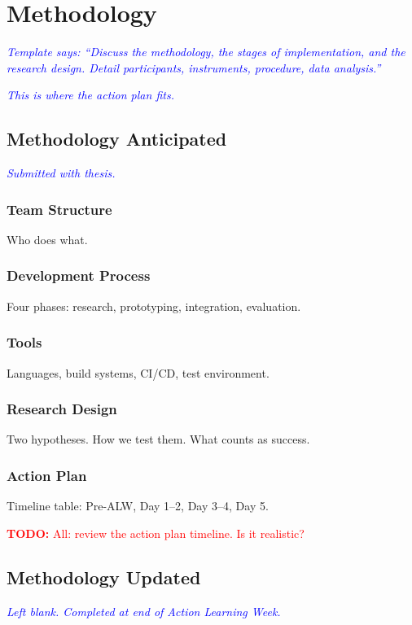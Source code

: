 \documentclass[12pt,oneside]{report}
\newcommand{\note}[1]{\textcolor{blue}{\textit{#1}}}
\newcommand{\todo}[1]{\textcolor{red}{\textbf{TODO:} #1}}
\begin{document}
\chapter{Methodology}

\note{Template says: ``Discuss the methodology, the stages of implementation, and the research design. Detail participants, instruments, procedure, data analysis.''}

\note{This is where the action plan fits.}

\section{Methodology Anticipated}
\note{Submitted with thesis.}

\subsection{Team Structure}
Who does what.

\subsection{Development Process}
Four phases: research, prototyping, integration, evaluation.

\subsection{Tools}
Languages, build systems, CI/CD, test environment.

\subsection{Research Design}
Two hypotheses. How we test them. What counts as success.

\subsection{Action Plan}
Timeline table: Pre-ALW, Day 1--2, Day 3--4, Day 5.

\todo{All: review the action plan timeline. Is it realistic?}

\section{Methodology Updated}
\note{Left blank. Completed at end of Action Learning Week.}

\end{document}
